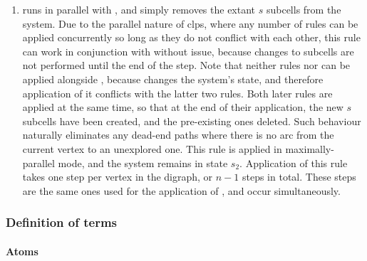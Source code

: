\begin{enumerate}
    \item {} runs in parallel with , and simply removes the extant \(s\) subcells from the system.  Due to the parallel nature of \gls{clps}, where any number of rules can be applied concurrently so long as they do not conflict with each other, this rule can work in conjunction with  without issue, because changes to subcells are not performed until the end of the step.  Note that neither rules  nor  can be applied alongside , because  changes the system's state, and therefore application of it conflicts with the latter two rules.  Both later rules are applied at the same time, so that at the end of their application, the new \(s\) subcells have been created, and the pre-existing ones deleted.  Such behaviour naturally eliminates any dead-end paths where there is no arc from the current vertex to an unexplored one.  This rule is applied in maximally-parallel mode, and the system remains in state \(s_2\).  Application of this rule takes one step per vertex in the digraph, or \(n - 1\) steps in total.  These steps are the same ones used for the application of , and occur simultaneously.
\end{enumerate}

\subsubsection{\label{sec:tsp:hppterms}Definition of terms}

\paragraph{Atoms}
\begin{description}
\end{description}

